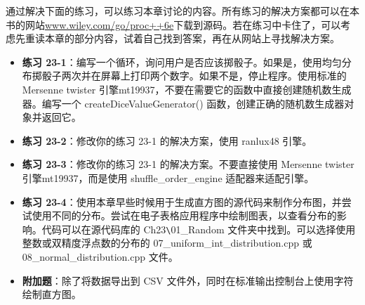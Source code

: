 通过解决下面的练习，可以练习本章讨论的内容。所有练习的解决方案都可以在本书的网站\url{www.wiley.com/go/proc++6e}下载到源码。若在练习中卡住了，可以考虑先重读本章的部分内容，试着自己找到答案，再在从网站上寻找解决方案。

\begin{itemize}
\item
\textbf{练习 23-1}：编写一个循环，询问用户是否应该掷骰子。如果是，使用均匀分布掷骰子两次并在屏幕上打印两个数字。如果不是，停止程序。使用标准的  Mersenne twister 引擎mt19937，不要在需要它的函数中直接创建随机数生成器。编写一个 createDiceValueGenerator() 函数，创建正确的随机数生成器对象并返回它。

\item
\textbf{练习 23-2}：修改你的练习 23-1 的解决方案，使用 ranlux48 引擎。

\item
\textbf{练习 23-3}：修改你的练习 23-1 的解决方案。不要直接使用  Mersenne twister 引擎mt19937，而是使用 shuffle\_order\_engine 适配器来适配引擎。

\item
\textbf{练习 23-4}：使用本章早些时候用于生成直方图的源代码来制作分布图，并尝试使用不同的分布。尝试在电子表格应用程序中绘制图表，以查看分布的影响。代码可以在源代码库的 Ch23\verb|\|01\_Random 文件夹中找到。可以选择使用整数或双精度浮点数的分布的 07\_uniform\_int\_distribution.cpp 或 08\_normal\_distribution.cpp 文件。

\item
\textbf{附加题}：除了将数据导出到 CSV 文件外，同时在标准输出控制台上使用字符绘制直方图。
\end{itemize}













